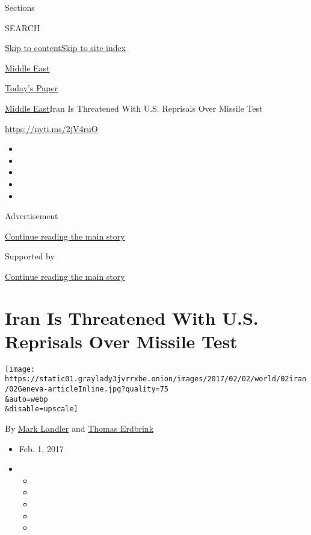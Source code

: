 Sections

SEARCH

\protect\hyperlink{site-content}{Skip to
content}\protect\hyperlink{site-index}{Skip to site index}

\href{https://www.nytimes3xbfgragh.onion/section/world/middleeast}{Middle
East}

\href{https://myaccount.nytimes3xbfgragh.onion/auth/login?response_type=cookie\&client_id=vi}{}

\href{https://www.nytimes3xbfgragh.onion/section/todayspaper}{Today's
Paper}

\href{/section/world/middleeast}{Middle East}\textbar{}Iran Is
Threatened With U.S. Reprisals Over Missile Test

\url{https://nyti.ms/2jV4ruO}

\begin{itemize}
\item
\item
\item
\item
\item
\end{itemize}

Advertisement

\protect\hyperlink{after-top}{Continue reading the main story}

Supported by

\protect\hyperlink{after-sponsor}{Continue reading the main story}

\hypertarget{iran-is-threatened-with-us-reprisals-over-missile-test}{%
\section{Iran Is Threatened With U.S. Reprisals Over Missile
Test}\label{iran-is-threatened-with-us-reprisals-over-missile-test}}

\texttt{[image: https://static01.graylady3jvrrxbe.onion/images/2017/02/02/world/02iran/02Geneva-articleInline.jpg?quality=75\\\&auto=webp\\\&disable=upscale]}

By \href{http://www.nytimes3xbfgragh.onion/by/mark-landler}{Mark
Landler} and
\href{http://www.nytimes3xbfgragh.onion/by/thomas-erdbrink}{Thomas
Erdbrink}

\begin{itemize}
\item
  Feb. 1, 2017
\item
  \begin{itemize}
  \item
  \item
  \item
  \item
  \item
  \end{itemize}
\end{itemize}

